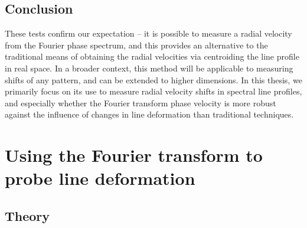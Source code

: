 %
%

\subsection{Conclusion}
These tests confirm our expectation --  it is possible to measure a radial velocity from
the Fourier phase spectrum, and this provides an alternative to the traditional 
means of obtaining the radial velocities via centroiding the line profile in real space. 
In a broader context, this method will be applicable to measuring shifts of any pattern, and  
can be extended to higher dimensions. In this thesis, we primarily focus on its use to measure radial velocity shifts in spectral line profiles, and especially whether the Fourier transform phase velocity is more
robust against the influence of changes in line deformation than traditional techniques.


\section{Using the Fourier transform to probe line deformation}
\label{\thesection}
\label{sec:FT_ld}


\subsection{Theory}
\label{sec:LD_Theory}

